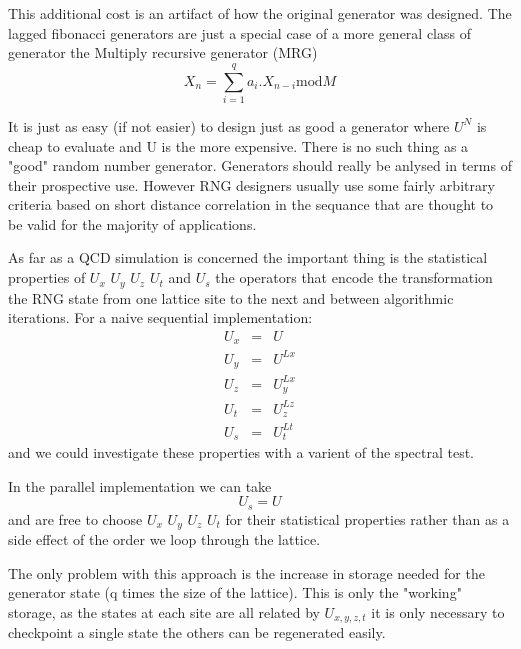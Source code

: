 \documentclass[12pt]{article}
\begin{document}
This additional cost is an artifact of how the original generator was
designed. The lagged fibonacci generators are just a special case of a
more general class of generator the Multiply recursive generator (MRG)
\begin{equation}
X_n  = \sum_{i=1}^q   a_i .X_{n-i} \mbox{mod} M
\end{equation}

It is just as easy (if not easier) to design just as good a
generator where $U^N$ is cheap to evaluate and U is the more expensive.
There is no such thing as a "good" random number generator. Generators
should really be anlysed in terms of their prospective use. However 
RNG designers usually use some fairly arbitrary criteria based on
short distance correlation in the sequance that are
thought to be valid for the majority of applications.

As far as a QCD simulation is concerned the important thing is the
statistical properties of $U_x$ $U_y$ $U_z$ $U_t$ and $U_s$ the operators that encode
the transformation the RNG state from one lattice site to the next and
between algorithmic iterations.
For a naive sequential implementation:
\begin{eqnarray}
  U_x &=& U \nonumber \\
  U_y &=& U^{Lx} \nonumber \\
  U_z &=& U_y^{Lx} \nonumber \\
  U_t &=& U_z^{Lz} \nonumber \\
  U_s &=& U_t^{Lt} \nonumber 
\end{eqnarray}
and we could investigate these properties with a varient of the
spectral test.

In the parallel implementation we can take
\begin{equation}
  U_s = U  
\end{equation}
and are free to choose $U_x$ $U_y$ $U_z$ $U_t$ for their statistical
properties rather than as a side effect of the order we loop through
the lattice.

The only problem with this approach is the increase in storage needed for the
generator state (q times the size of the lattice). This is only the
"working" storage, as the states at each site are all related by $U_{x,y,z,t}$
it is only necessary to checkpoint a single state the others can be
regenerated easily.
\end{document}
